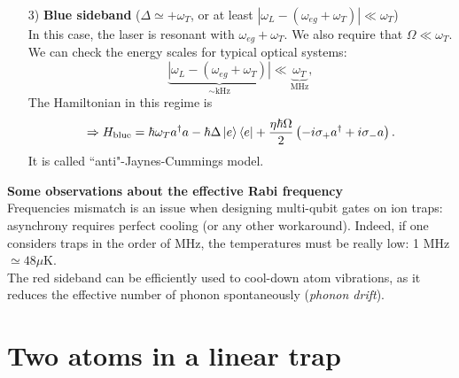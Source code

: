 \begin{enumerate}
\item[3)] \textbf{Blue sideband} ($\Delta \simeq +\omega_T$, or at least $|\omega_L - (\omega_{eg}+\omega_T)| \ll \omega_T$) \\
In this case, the laser is resonant with $\omega_{eg} +\omega_T$. We also require that $\Omega \ll \omega_T$. \\
We can check the energy scales for typical optical systems:
$$\underbrace{|\omega_L -(\omega_{eg}+\omega_T)|}_
{\sim \text{kHz}}
\ll
\underbrace{\omega_T}_{\text{MHz}},$$
The Hamiltonian in this regime is 
\begin{equation*}
\Rightarrow H_{\text{blue}} = \hbar\omega_Ta^\dag a
-
\hbar\Delta\ket{e}\bra{e}
+
\frac{\eta\hbar\Omega}{2}
\left(-i\sigma_+a^\dag+i\sigma_-a\right).
\end{equation*}
It is called ``anti"-Jaynes-Cummings model. 

\begin{center}

\end{center}

\end{enumerate}


\begin{tcolorbox} 
\textbf{{Some observations about the effective Rabi frequency}} \\
Frequencies mismatch is an issue when designing multi-qubit gates on ion traps: asynchrony requires perfect cooling (or any other workaround). Indeed, if one considers traps in the order of MHz, the temperatures must be really low: 1 MHz $\simeq 48\mu$K. \\
The red sideband can be efficiently used to cool-down atom vibrations, as it reduces the effective number of phonon spontaneously (\textit{phonon drift}).
\end{tcolorbox}


\section{Two atoms in a linear trap}

\begin{center}
    
\end{center}

